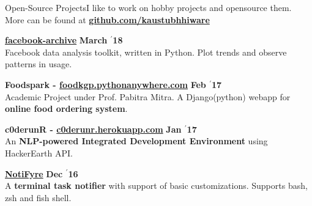 \documentclass{resume} %
\begin{document}
\begin{rSection}{\large Open-Source Projects}{}{I like to work on hobby projects and opensource them. More can be found at \textbf{\href{https://github.com/kaustubhhiware}{github.com/kaustubhhiware}}}

{\bf \large \href{https://github.com/kaustubhhiware/facebook-archive}{facebook-archive}} \hfill \textbf{March $^{\prime}$18} \\ 
Facebook data analysis toolkit, written in Python. Plot trends and observe patterns in usage.

{\bf \large Foodspark - \url{foodkgp.pythonanywhere.com}} \hfill \textbf{Feb $^{\prime}$17} \\ 
Academic Project under Prof. Pabitra Mitra. A Django(python) webapp for \textbf{online food ordering system}.

{\bf \large c0derunR - \url{c0derunr.herokuapp.com}} \hfill \textbf{Jan $^{\prime}$17} \\ 
An \textbf{NLP-powered Integrated Development Environment} using HackerEarth API. %

{\bf \large \href{https://github.com/kaustubhhiware/NotiFyre}{NotiFyre}} \hfill \textbf{Dec $^{\prime}$16} \\ 
A \textbf{terminal task notifier} with support of basic customizations. Supports bash, zsh and fish shell.





\end{rSection}
\end{document}
